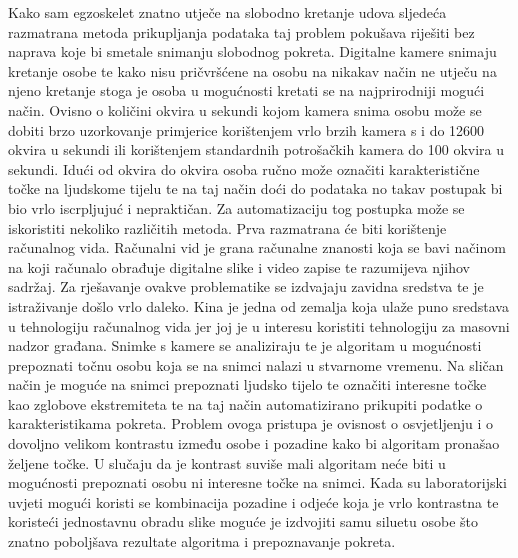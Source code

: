 \documentclass[times, utf8, diplomski]{fer}
\begin{document}
Kako sam egzoskelet znatno utječe na slobodno kretanje udova sljedeća razmatrana metoda prikupljanja podataka taj problem pokušava riješiti
bez naprava koje bi smetale snimanju slobodnog pokreta. Digitalne kamere snimaju kretanje osobe te kako nisu pričvršćene na osobu
na nikakav način ne utječu na njeno kretanje stoga je osoba u mogućnosti kretati se na najprirodniji mogući način. Ovisno o količini
okvira u sekundi kojom kamera snima osobu može se dobiti brzo uzorkovanje primjerice korištenjem vrlo brzih kamera s i do
12600 okvira u sekundi ili korištenjem standardnih potrošačkih kamera do 100 okvira u sekundi. Idući od okvira do okvira osoba ručno
može označiti karakteristične točke na ljudskome tijelu te na taj način doći do podataka no takav postupak bi bio vrlo iscrpljujuć i
nepraktičan. Za automatizaciju tog postupka može se iskoristiti nekoliko različitih metoda. Prva razmatrana će biti korištenje
računalnog vida. Računalni vid je grana računalne znanosti koja se bavi načinom na koji računalo obrađuje digitalne slike i video zapise 
te razumijeva njihov sadržaj. Za rješavanje ovakve problematike se izdvajaju zavidna sredstva te je istraživanje došlo vrlo daleko.
Kina je jedna od zemalja koja ulaže puno sredstava u tehnologiju računalnog vida jer joj je u interesu koristiti tehnologiju za 
masovni nadzor građana. Snimke s kamere se analiziraju te je algoritam u mogućnosti prepoznati točnu osobu koja se na 
snimci nalazi u stvarnome vremenu. Na sličan način je moguće na snimci prepoznati ljudsko tijelo te označiti interesne točke kao zglobove ekstremiteta
te na taj način automatizirano prikupiti podatke o karakteristikama pokreta. Problem ovoga pristupa je ovisnost o osvjetljenju i o
dovoljno velikom kontrastu između osobe i pozadine kako bi algoritam pronašao željene točke. U slučaju da je kontrast suviše mali 
algoritam neće biti u mogućnosti prepoznati osobu ni interesne točke na snimci. Kada su laboratorijski uvjeti mogući koristi se
kombinacija pozadine i odjeće koja je vrlo kontrastna te koristeći jednostavnu obradu slike moguće je izdvojiti samu siluetu osobe
što znatno poboljšava rezultate algoritma i prepoznavanje pokreta.
\end{document}
